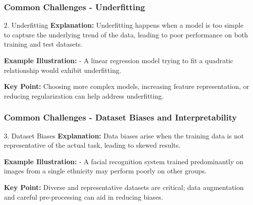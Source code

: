 \documentclass{beamer}
\begin{document}
\begin{frame}[fragile]
    \frametitle{Common Challenges - Underfitting}
    \begin{block}{2. Underfitting}
        \textbf{Explanation:}  
        Underfitting happens when a model is too simple to capture the underlying trend of the data, leading to poor performance on both training and test datasets.
    \end{block}

    \textbf{Example Illustration:}  
    - A linear regression model trying to fit a quadratic relationship would exhibit underfitting.

    \textbf{Key Point:}  
    Choosing more complex models, increasing feature representation, or reducing regularization can help address underfitting.
\end{frame}

\begin{frame}[fragile]
    \frametitle{Common Challenges - Dataset Biases and Interpretability}
    \begin{block}{3. Dataset Biases}
        \textbf{Explanation:}  
        Data biases arise when the training data is not representative of the actual task, leading to skewed results.
    \end{block}

    \textbf{Example Illustration:}  
    - A facial recognition system trained predominantly on images from a single ethnicity may perform poorly on other groups.

    \textbf{Key Point:}  
    Diverse and representative datasets are critical; data augmentation and careful pre-processing can aid in reducing biases.
\end{frame}
\end{document}
